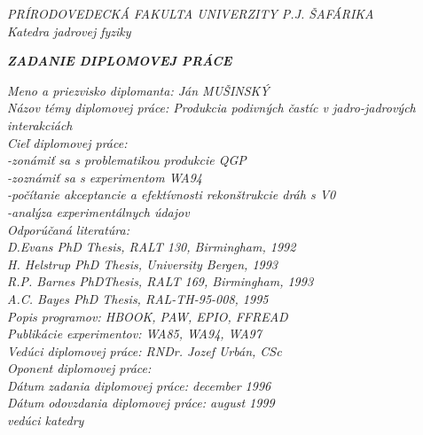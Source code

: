 \begin{titlepage}
\parindent 0cm
\begin{center}
  {\it PRÍRODOVEDECKÁ FAKULTA UNIVERZITY P.J. ŠAFÁRIKA \\
Katedra jadrovej fyziky} \\
\end{center}
\vspace*{0.5cm}
\begin{center}
  {\it {\bf ZADANIE DIPLOMOVEJ PRÁCE}}
\end{center}
\vspace*{0.5cm}
{\it Meno a priezvisko diplomanta:  Ján MUŠINSKÝ \\

Názov témy diplomovej práce:  Produkcia podivných častíc v jadro-jadrových \\
\hspace*{5.5cm}interakciách \\

Cieľ diplomovej práce:  \\
\hspace*{3.5cm} -zonámiť sa s problematikou produkcie QGP \\ 
\hspace*{3.5cm} -zoznámiť sa s experimentom WA94 \\ 
\hspace*{3.5cm} -počítanie akceptancie a efektívnosti
 rekonštrukcie dráh s V0 \\  
\hspace*{3.5cm} -analýza experimentálnych údajov \\


Odporúčaná literatúra: \\

D.Evans PhD Thesis, RALT 130, Birmingham, 1992 \\
H. Helstrup PhD Thesis, University Bergen, 1993 \\
R.P. Barnes PhDThesis, RALT 169, Birmingham, 1993 \\
A.C. Bayes PhD Thesis, RAL-TH-95-008, 1995 \\

Popis programov: HBOOK, PAW, EPIO, FFREAD \\
Publikácie experimentov: WA85, WA94, WA97 \\

\vspace*{1cm}
Vedúci diplomovej práce: RNDr. Jozef Urbán, CSc \\

Oponent diplomovej práce: \\

Dátum zadania diplomovej práce: december 1996 \\

Dátum odovzdania diplomovej práce: august 1999 \\

\vspace{1cm}
\hspace*{10cm}
 vedúci katedry }
\end{titlepage}

